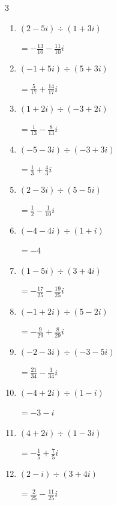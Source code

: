 \begin{multicols}{3}
\begin{enumerate}
  \item $\displaystyle (2-5i)\div(1+3i)$

        $\displaystyle =-\frac{13}{10}-\frac{11}{10}i$

  \item $\displaystyle (-1+5i)\div(5+3i)$

        $\displaystyle =\frac{5}{17}+\frac{14}{17}i$

  \item $\displaystyle (1+2i)\div(-3+2i)$

        $\displaystyle =\frac{1}{13}-\frac{8}{13}i$

  \item $\displaystyle (-5-3i)\div(-3+3i)$

        $\displaystyle =\frac{1}{3}+\frac{4}{3}i$

  \item $\displaystyle (2-3i)\div(5-5i)$

        $\displaystyle =\frac{1}{2}-\frac{1}{10}i$

  \item $\displaystyle (-4-4i)\div(1+i)$

        $\displaystyle =-4$

\columnbreak %

\resetques

  \item $\displaystyle (1-5i)\div(3+4i)$

        $\displaystyle =-\frac{17}{25}-\frac{19}{25}i$

  \item $\displaystyle (-1+2i)\div(5-2i)$

        $\displaystyle =-\frac{9}{29}+\frac{8}{29}i$

  \item $\displaystyle (-2-3i)\div(-3-5i)$

        $\displaystyle =\frac{21}{34}-\frac{1}{34}i$

  \item $\displaystyle (-4+2i)\div(1-i)$

        $\displaystyle =-3-i$

  \item $\displaystyle (4+2i)\div(1-3i)$

        $\displaystyle =-\frac{1}{5}+\frac{7}{5}i$

  \item $\displaystyle (2-i)\div(3+4i)$

        $\displaystyle =\frac{2}{25}-\frac{11}{25}i$


\end{enumerate}
\end{multicols}
